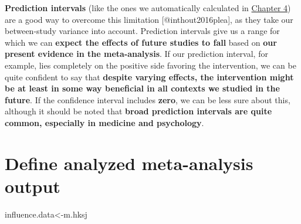\documentclass[]{book}
\newenvironment{Shaded}{\begin{snugshade}}{\end{snugshade}}
\newcommand{\KeywordTok}[1]{\textcolor[rgb]{0.13,0.29,0.53}{\textbf{#1}}}
\newcommand{\DataTypeTok}[1]{\textcolor[rgb]{0.13,0.29,0.53}{#1}}
\newcommand{\DecValTok}[1]{\textcolor[rgb]{0.00,0.00,0.81}{#1}}
\newcommand{\StringTok}[1]{\textcolor[rgb]{0.31,0.60,0.02}{#1}}
\newcommand{\OperatorTok}[1]{\textcolor[rgb]{0.81,0.36,0.00}{\textbf{#1}}}
\newcommand{\NormalTok}[1]{#1}
\theoremstyle{definition}
\theoremstyle{definition}
\theoremstyle{definition}
\theoremstyle{remark}
\begin{document}
\begin{rmdachtung}
\textbf{Prediction intervals} (like the ones we automatically calculated
in \protect\hyperlink{pool}{Chapter 4}) are a good way to overcome this
limitation {[}@inthout2016plea{]}, as they take our between-study
variance into account. Prediction intervals give us a range for which we
can \textbf{expect the effects of future studies to fall} based on
\textbf{our present evidence in the meta-analysis}. If our prediction
interval, for example, lies completely on the positive side favoring the
intervention, we can be quite confident to say that \textbf{despite
varying effects, the intervention might be at least in some way
beneficial in all contexts we studied in the future}. If the confidence
interval includes \textbf{zero}, we can be less sure about this,
although it should be noted that \textbf{broad prediction intervals are
quite common, especially in medicine and psychology}.
\end{rmdachtung}

\section{Define analyzed meta-analysis
output}\label{define-analyzed-meta-analysis-output}

\begin{Shaded}
\begin{Highlighting}[]
\NormalTok{influence.data<-m.hksj}
\end{Highlighting}
\end{Shaded}

\begin{Shaded}
\end{Shaded}
\end{document}
